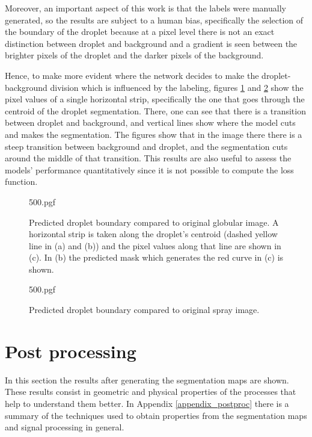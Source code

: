 Moreover, an important aspect of this work is that the labels were manually generated, so the results are subject to a human bias, specifically the selection of the boundary of the droplet because at a pixel level there is not an exact distinction between droplet and background and a gradient is seen between the brighter pixels of the droplet and the darker pixels of the background.

Hence, to make more evident where the network decides to make  the droplet-background division which is influenced by the labeling, figures \ref{fig:boundary_globular} and \ref{fig:boundary_spray} show the pixel values of a single horizontal strip, specifically the one that goes through the centroid of the droplet segmentation. There, one can see that there is a transition between droplet and background, and vertical lines show where the model cuts and makes the segmentation. The figures show that in the image there there is a steep transition between background and droplet, and the segmentation cuts around the middle of that transition. This results are also useful to assess the models' performance quantitatively since it is not possible to compute the loss function.

\begin{figure}
    \centering
    {500.pgf}
    \caption[Predicted droplet boundary compared to original globular image]{Predicted droplet boundary compared to original globular image. A horizontal strip is taken along the droplet's centroid (dashed yellow line in (a) and (b)) and the pixel values along that line are shown in (c). In (b) the predicted mask which generates the red curve in (c) is shown.}
    \label{fig:boundary_globular}
\end{figure}

\begin{figure}
    \centering
    {500.pgf}
    \caption[Predicted droplet boundary compared to original spray image]{Predicted droplet boundary compared to original spray image.}
    \label{fig:boundary_spray}
\end{figure}

\clearpage

\section{Post processing}
In this section the results after generating the segmentation maps are shown. These results consist in geometric and physical properties of the processes that help to understand them better. In Appendix \ref{appendix_postproc} there is a summary of the techniques used to obtain properties from the segmentation maps and signal processing in general.

